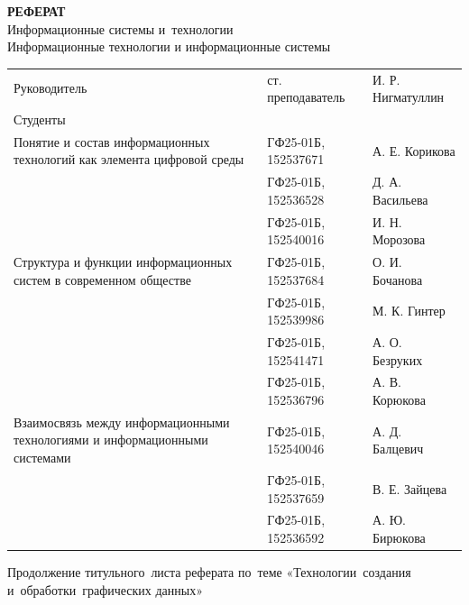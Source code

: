 \documentclass{ou}
\begin{document}
\thispagestyle{empty}
\begin{center}
\shortstack{\FGAVO}\vspace{4\baselineskip}
\textbf{РЕФЕРАТ}\\
Информационные системы и~технологии\\
Информационные технологии и информационные системы\vspace{2\baselineskip}\end{center}
\begin{flushleft}
\doublespacing
\begin{tabularx}{\textwidth}{@{} p{} l l @{}}
Руководитель & ст. преподаватель & И. Р. Нигматуллин\\
Студенты     &                   &                  \\
\multirow{-2.27}{\hsize}{\singlespacing Понятие и состав информационных технологий как элемента цифровой среды}
             & ГФ25-01Б, 152537671 & А. Е. Корикова\\
             & ГФ25-01Б, 152536528 & Д. А. Васильева\\
             & ГФ25-01Б, 152540016 & И. Н. Морозова\\
\multirow{-2.27}{\hsize}{\singlespacing Структура и функции информационных систем в современном обществе}
             & ГФ25-01Б, 152537684 & О. И. Бочанова\\
             & ГФ25-01Б, 152539986 & М. К. Гинтер\\
             & ГФ25-01Б, 152541471 & А. О. Безруких\\
             & ГФ25-01Б, 152536796 & А. В. Корюкова\\
\multirow{-2.27}{\hsize}{\singlespacing Взаимосвязь между информационными технологиями и информационными системами}
             & ГФ25-01Б, 152540046 & А. Д. Балцевич\\
             & ГФ25-01Б, 152537659 & В. Е. Зайцева\\
             & ГФ25-01Б, 152536592 & А. Ю. Бирюкова\\
\end{tabularx}
\end{flushleft}
\vspace*{\fill}
\begin{center}
\city
\end{center}
\newpage
\thispagestyle{empty}
Продолжение титульного~листа реферата по~теме «Технологии~создания\\и~обработки~графических данных»
\end{document}
